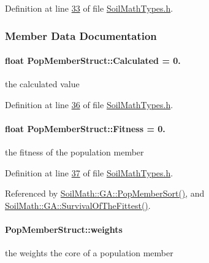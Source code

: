 Definition at line \hyperlink{_soil_math_types_8h_source_l00033}{33} of file \hyperlink{_soil_math_types_8h_source}{Soil\+Math\+Types.\+h}.



\subsubsection{Member Data Documentation}
\hypertarget{struct_pop_member_struct_a8e76eeb476bc89f765b1d872d399fe0c}{}
\paragraph[{Calculated}]{\setlength{\rightskip}{0pt plus 5cm}float Pop\+Member\+Struct\+::\+Calculated = 0.}\label{struct_pop_member_struct_a8e76eeb476bc89f765b1d872d399fe0c}
the calculated value 

Definition at line \hyperlink{_soil_math_types_8h_source_l00036}{36} of file \hyperlink{_soil_math_types_8h_source}{Soil\+Math\+Types.\+h}.

\hypertarget{struct_pop_member_struct_a750ec8010731e3e2a876051475c31b14}{}
\paragraph[{Fitness}]{\setlength{\rightskip}{0pt plus 5cm}float Pop\+Member\+Struct\+::\+Fitness = 0.}\label{struct_pop_member_struct_a750ec8010731e3e2a876051475c31b14}
the fitness of the population member 

Definition at line \hyperlink{_soil_math_types_8h_source_l00037}{37} of file \hyperlink{_soil_math_types_8h_source}{Soil\+Math\+Types.\+h}.



Referenced by \hyperlink{_g_a_8h_source_l00178}{Soil\+Math\+::\+G\+A\+::\+Pop\+Member\+Sort()}, and \hyperlink{_g_a_8cpp_source_l00189}{Soil\+Math\+::\+G\+A\+::\+Survival\+Of\+The\+Fittest()}.

\hypertarget{struct_pop_member_struct_aeba960170ef60a906c730cc24cd90367}{}
\paragraph[{weights}]{ Pop\+Member\+Struct\+::weights}\label{struct_pop_member_struct_aeba960170ef60a906c730cc24cd90367}
the weights the core of a population member 

